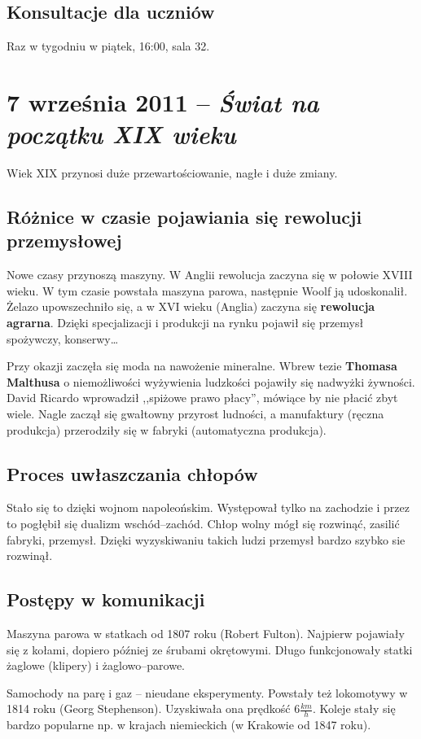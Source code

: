 \documentclass [a4paper, 11pt, oneside]{book}
\begin{document}
\section{Konsultacje dla uczniów}
    Raz w tygodniu w piątek, 16:00, sala 32.

\chapter{7 września 2011 -- \textit{Świat na początku XIX wieku}}
    Wiek XIX przynosi duże przewartościowanie, nagłe i duże zmiany.
    \section{Różnice w czasie pojawiania się \textbf{rewolucji przemysłowej}}
        Nowe czasy przynoszą maszyny. W Anglii rewolucja zaczyna się w połowie XVIII wieku. W tym czasie powstała maszyna parowa, następnie Woolf ją udoskonalił. Żelazo upowszechniło się, a w XVI wieku (Anglia) zaczyna się \textbf{rewolucja agrarna}. Dzięki specjalizacji i produkcji na rynku pojawił się przemysł spożywczy, konserwy\dots

        Przy okazji zaczęła się moda na nawożenie mineralne. Wbrew tezie \textbf{Thomasa Malthusa} o niemożliwości wyżywienia ludzkości pojawiły się nadwyżki żywności. David Ricardo wprowadził ,,spiżowe prawo płacy'', mówiące by nie płacić zbyt wiele. Nagle zaczął się gwałtowny przyrost ludności, a manufaktury (ręczna produkcja) przerodziły się w fabryki (automatyczna produkcja).
    \section{Proces uwłaszczania chłopów}
        Stało się to dzięki wojnom napoleońskim. Występował tylko na zachodzie i przez to pogłębił się dualizm wschód--zachód. Chłop wolny mógł się rozwinąć, zasilić fabryki, przemysł. Dzięki wyzyskiwaniu takich ludzi przemysł bardzo szybko sie rozwinął.
    \section{Postępy w komunikacji}
        Maszyna parowa w statkach od 1807 roku (Robert Fulton). Najpierw pojawiały się z kołami, dopiero później ze śrubami okrętowymi. Długo funkcjonowały statki żaglowe (klipery) i żaglowo--parowe.

        Samochody na parę i gaz -- nieudane eksperymenty. Powstały też lokomotywy w 1814 roku (Georg Stephenson). Uzyskiwała ona prędkość $6\frac{km}h$. Koleje stały się bardzo popularne np. w krajach niemieckich (w Krakowie od 1847 roku).
\end{document}
